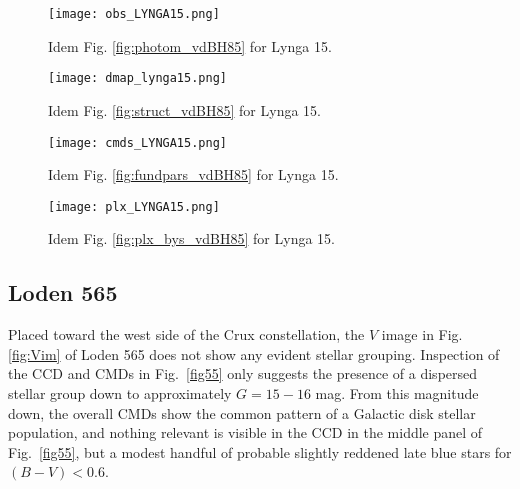 \documentclass[draft]{aa}
\begin{document}
\begin{figure*}[ht]
    \centering
    \texttt{[image: obs\_LYNGA15.png]}
    \caption{Idem Fig. \ref{fig:photom_vdBH85} for Lynga 15.}
    \label{fig51}
\end{figure*}
\begin{figure*}[ht]
    \centering
    \texttt{[image: dmap\_lynga15.png]}
    \caption{Idem Fig. \ref{fig:struct_vdBH85} for Lynga 15.}
    \label{fig52}
\end{figure*}
\begin{figure*}[ht]
    \centering
    \texttt{[image: cmds\_LYNGA15.png]}
    \caption{Idem Fig. \ref{fig:fundpars_vdBH85} for Lynga 15.}
    \label{fig53}
\end{figure*}
\begin{figure*}[ht]
    \centering
    \texttt{[image: plx\_LYNGA15.png]}
    \caption{Idem Fig. \ref{fig:plx_bys_vdBH85} for Lynga 15.}
    \label{fig54}
\end{figure*}



\subsection{Loden 565}

Placed toward the west side of the Crux constellation, the $V$ image in Fig. 
\ref{fig:Vim} of Loden 565 does not show any evident stellar grouping. Inspection
of the CCD and CMDs in Fig.~\ref{fig55} only suggests the presence of a
dispersed stellar group down to approximately $G=15-16$ mag. From this magnitude
down, the overall CMDs show the common pattern of a Galactic disk stellar population,
and nothing relevant is visible in the CCD in the middle panel of
Fig.~\ref{fig55}, but a modest handful of probable slightly reddened late blue
stars for $(B-V)<0.6$.\\
\end{document}
